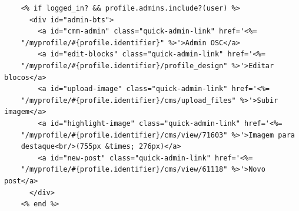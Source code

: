 {\tiny
  \begin{verbatim}
    <% if logged_in? && profile.admins.include?(user) %>
      <div id="admin-bts">
        <a id="cmm-admin" class="quick-admin-link" href='<%=
    "/myprofile/#{profile.identifier}" %>'>Admin OSC</a>
        <a id="edit-blocks" class="quick-admin-link" href='<%=
    "/myprofile/#{profile.identifier}/profile_design" %>'>Editar blocos</a>
        <a id="upload-image" class="quick-admin-link" href='<%=
    "/myprofile/#{profile.identifier}/cms/upload_files" %>'>Subir imagem</a>
        <a id="highlight-image" class="quick-admin-link" href='<%=
    "/myprofile/#{profile.identifier}/cms/view/71603" %>'>Imagem para
    destaque<br/>(755px &times; 276px)</a>
        <a id="new-post" class="quick-admin-link" href='<%=
    "/myprofile/#{profile.identifier}/cms/view/61118" %>'>Novo post</a>
      </div>
    <% end %>
  \end{verbatim}
}
